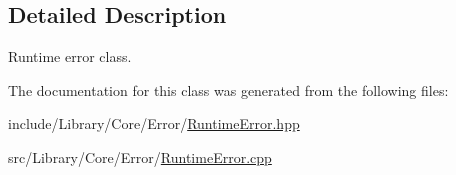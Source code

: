 \subsection{Detailed Description}
Runtime error class. 

The documentation for this class was generated from the following files\+:\begin{DoxyCompactItemize}
\item 
include/\+Library/\+Core/\+Error/\hyperlink{_runtime_error_8hpp}{Runtime\+Error.\+hpp}\item 
src/\+Library/\+Core/\+Error/\hyperlink{_runtime_error_8cpp}{Runtime\+Error.\+cpp}\end{DoxyCompactItemize}
